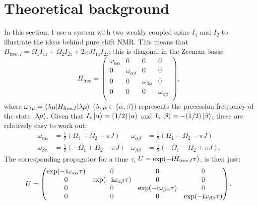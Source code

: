 \section{Theoretical background}
\label{sec:pureshift__intro_theory}

In this section, I use a system with two weakly coupled spins $I_1$ and $I_2$ to illustrate the ideas behind pure shift NMR.
This means that $H_{\text{free},I} = \Omega_1 I_{1z} + \Omega_2 I_{2z} + 2\pi JI_{1z}I_{2z}$; this is diagonal in the Zeeman basis:
\begin{equation}
    \label{eq:h_free_weak}
    H_\text{free} = \begin{pmatrix}
        \omega_{\alpha\alpha} & 0 & 0 & 0 \\
        0 & \omega_{\alpha\beta} & 0 & 0 \\
        0 & 0 & \omega_{\beta\alpha} & 0 \\
        0 & 0 & 0 & \omega_{\beta\beta} \\
    \end{pmatrix},
\end{equation}
where $\omega_{\lambda\mu} = \braket{\lambda\mu|H_{\text{free},I}|\lambda\mu}$ ($\lambda, \mu \in \{\alpha, \beta\}$) represents the precession frequency of the state $\ket{\lambda\mu}$.
Given that $I_z\ket{\alpha} = (1/2)\ket{\alpha}$ and $I_z\ket{\beta} = -(1/2)\ket{\beta}$, these are relatively easy to work out:
\begin{equation}
    \label{eq:state_precessions}
    \begin{aligned}
        \omega_{\alpha\alpha} &= \frac{1}{2}(\Omega_1 + \Omega_2 + \pi J) &
        \omega_{\alpha\beta} &= \frac{1}{2}(\Omega_1 - \Omega_2 - \pi J) \\
        \omega_{\beta\alpha} &= \frac{1}{2}(-\Omega_1 + \Omega_2 - \pi J) &
        \omega_{\beta\beta} &= \frac{1}{2}(-\Omega_1 - \Omega_2 + \pi J).
    \end{aligned}
\end{equation}
The corresponding propagator for a time $\tau$, $U = \exp(-\mathrm{i} H_{\text{free},I}\tau)$, is then just:
\begin{equation}
    \label{eq:u_free_weak}
    U = \begin{pmatrix}
        \exp(-\mathrm{i}\omega_{\alpha\alpha}\tau) & 0 & 0 & 0 \\
        0 & \exp(-\mathrm{i}\omega_{\alpha\beta}\tau) & 0 & 0 \\
        0 & 0 & \exp(-\mathrm{i}\omega_{\beta\alpha}\tau) & 0 \\
        0 & 0 & 0 & \exp(-\mathrm{i}\omega_{\beta\beta}\tau) \\
    \end{pmatrix}.
\end{equation}

